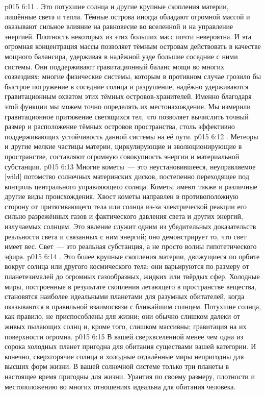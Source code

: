 \vs p015 6:11 \pc {}. Это потухшие солнца и другие крупные скопления материи, лишённые света и тепла. Тёмные острова иногда обладают огромной массой и оказывают сильное влияние на равновесие во вселенной и на управление энергией. Плотность некоторых из этих больших масс почти невероятна. И эта огромная концентрация массы позволяет тёмным островам действовать в качестве мощного балансира, удерживая в надёжной узде большие соседние с ними системы. Они поддерживают гравитационный баланс мощи во многих созвездиях; многие физические системы, которым в противном случае грозило бы быстрое погружение в соседние солнца и разрушение, надёжно удерживаются гравитационным охватом этих тёмных островов\hyp{}хранителей. Именно благодаря этой функции мы можем точно определять их местонахождение. Мы измерили гравитационное притяжение светящихся тел, что позволяет вычислить точный размер и расположение тёмных островов пространства, столь эффективно поддерживающих устойчивость данной системы на её пути.
\vs p015 6:12 \pc {}. Метеоры и другие мелкие частицы материи, циркулирующие и эволюционирующие в пространстве, составляют огромную совокупность энергии и материальной субстанции.
\vs p015 6:13 Многие кометы~--- это неустановившееся, неуправляемое [wild] потомство солнечных материнских дисков, постепенно переходящее под контроль центрального управляющего солнца. Кометы имеют также и различные другие виды происхождения. Хвост кометы направлен в противоположную сторону от притягивающего тела или солнца из\hyp{}за электрической реакции его сильно разрежённых газов и фактического давления света и других энергий, излучаемых солнцем. Это явление служит одним из убедительных доказательств реальности света и связанных с ним энергий; оно демонстрирует то, что свет имеет вес. Свет~--- это реальная субстанция, а не просто волны гипотетического эфира.
\vs p015 6:14 \pc {}. Это более крупные скопления материи, движущиеся по орбите вокруг солнца или другого космического тела; они варьируются по размеру от планетезималей до огромных газообразных, жидких или твёрдых сфер. Холодные миры, построенные в результате скопления летающего в пространстве вещества, становятся наиболее идеальными планетами для разумных обитателей, когда оказываются в правильной взаимосвязи с ближайшим солнцем. Потухшие солнца, как правило, не приспособлены для жизни; они обычно слишком далеки от живых пылающих солнц и, кроме того, слишком массивны; гравитация на их поверхности огромна.
\vs p015 6:15 В вашей сверхвселенной менее чем одна из сорока холодных планет пригодна для обитания существами вашей категории. И конечно, сверхгорячие солнца и холодные отдалённые миры непригодны для высших форм жизни. В вашей солнечной системе только три планеты в настоящее время пригодны для жизни. Урантия по своему размеру, плотности и местоположению во многих отношениях идеальна для обитания человека.
